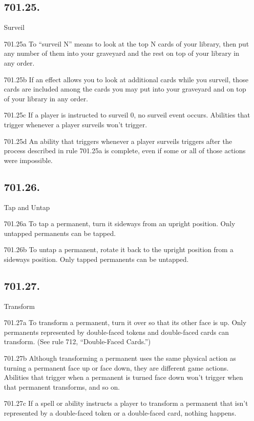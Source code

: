 \subsection*{701.25.}
Surveil

701.25a To “surveil N” means to look at the top N cards of your library, then put any number of them into your graveyard and the rest on top of your library in any order.

701.25b If an effect allows you to look at additional cards while you surveil, those cards are included among the cards you may put into your graveyard and on top of your library in any order.

701.25c If a player is instructed to surveil 0, no surveil event occurs. Abilities that trigger whenever a player surveils won’t trigger.

701.25d An ability that triggers whenever a player surveils triggers after the process described in rule 701.25a is complete, even if some or all of those actions were impossible.

\subsection*{701.26.}
Tap and Untap

701.26a To tap a permanent, turn it sideways from an upright position. Only untapped permanents can be tapped.

701.26b To untap a permanent, rotate it back to the upright position from a sideways position. Only tapped permanents can be untapped.

\subsection*{701.27.}
Transform

701.27a To transform a permanent, turn it over so that its other face is up. Only permanents represented by double-faced tokens and double-faced cards can transform. (See rule 712, “Double-Faced Cards.”)

701.27b Although transforming a permanent uses the same physical action as turning a permanent face up or face down, they are different game actions. Abilities that trigger when a permanent is turned face down won’t trigger when that permanent transforms, and so on.

701.27c If a spell or ability instructs a player to transform a permanent that isn’t represented by a double-faced token or a double-faced card, nothing happens.

